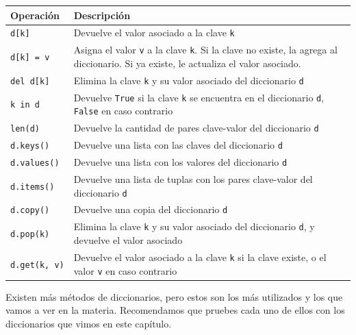 \documentclass[
  letterpaper,
  DIV=11,
  numbers=noendperiod]{scrreprt}
\begin{document}
\begin{longtable}[]{@{}
  >{\raggedright\arraybackslash}p{}
  >{\raggedright\arraybackslash}p{}@{}}
\toprule\noalign{}
\begin{minipage}[b]{\linewidth}\raggedright
Operación
\end{minipage} & \begin{minipage}[b]{\linewidth}\raggedright
Descripción
\end{minipage} \\
\midrule\noalign{}
\endhead
\bottomrule\noalign{}
\endlastfoot
\texttt{d{[}k{]}} & Devuelve el valor asociado a la clave \texttt{k} \\
\texttt{d{[}k{]}\ =\ v} & Asigna el valor \texttt{v} a la clave
\texttt{k}. Si la clave no existe, la agrega al diccionario. Si ya
existe, le actualiza el valor asociado. \\
\texttt{del\ d{[}k{]}} & Elimina la clave \texttt{k} y su valor asociado
del diccionario \texttt{d} \\
\texttt{k\ in\ d} & Devuelve \texttt{True} si la clave \texttt{k} se
encuentra en el diccionario \texttt{d}, \texttt{False} en caso
contrario \\
\texttt{len(d)} & Devuelve la cantidad de pares clave-valor del
diccionario \texttt{d} \\
\texttt{d.keys()} & Devuelve una lista con las claves del diccionario
\texttt{d} \\
\texttt{d.values()} & Devuelve una lista con los valores del diccionario
\texttt{d} \\
\texttt{d.items()} & Devuelve una lista de tuplas con los pares
clave-valor del diccionario \texttt{d} \\
\texttt{d.copy()} & Devuelve una copia del diccionario \texttt{d} \\
\texttt{d.pop(k)} & Elimina la clave \texttt{k} y su valor asociado del
diccionario \texttt{d}, y devuelve el valor asociado \\
\texttt{d.get(k,\ v)} & Devuelve el valor asociado a la clave \texttt{k}
si la clave existe, o el valor \texttt{v} en caso contrario \\
\end{longtable}

\begin{tcolorbox}[enhanced jigsaw, opacitybacktitle=0.6, toptitle=1mm, toprule=.15mm, arc=.35mm, breakable, bottomrule=.15mm, opacityback=0, leftrule=.75mm, rightrule=.15mm, title=\textcolor{quarto-callout-note-color}{\faInfo}\hspace{0.5em}{Note}, left=2mm, bottomtitle=1mm, colframe=quarto-callout-note-color-frame, colback=white, titlerule=0mm, coltitle=black, colbacktitle=quarto-callout-note-color!10!white]

Existen más métodos de diccionarios, pero estos son los más utilizados y
los que vamos a ver en la materia. Recomendamos que pruebes cada uno de
ellos con los diccionarios que vimos en este capítulo.

\end{tcolorbox}
\end{document}
